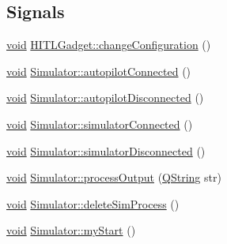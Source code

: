 \subsection*{Signals}
\begin{DoxyCompactItemize}
\item 
\hyperlink{group___u_a_v_objects_plugin_ga444cf2ff3f0ecbe028adce838d373f5c}{void} \hyperlink{group___h_i_t_l_plugin_ga13e1705f62c6f94853cd64d477b213ef}{H\-I\-T\-L\-Gadget\-::change\-Configuration} ()
\item 
\hyperlink{group___u_a_v_objects_plugin_ga444cf2ff3f0ecbe028adce838d373f5c}{void} \hyperlink{group___h_i_t_l_plugin_gac7a4b06b939b52699df392d65a575285}{Simulator\-::autopilot\-Connected} ()
\item 
\hyperlink{group___u_a_v_objects_plugin_ga444cf2ff3f0ecbe028adce838d373f5c}{void} \hyperlink{group___h_i_t_l_plugin_ga24f5c82338e62ddaa39f3ea0624f71da}{Simulator\-::autopilot\-Disconnected} ()
\item 
\hyperlink{group___u_a_v_objects_plugin_ga444cf2ff3f0ecbe028adce838d373f5c}{void} \hyperlink{group___h_i_t_l_plugin_gaa228d07fc331cb9526ea7e35657c762c}{Simulator\-::simulator\-Connected} ()
\item 
\hyperlink{group___u_a_v_objects_plugin_ga444cf2ff3f0ecbe028adce838d373f5c}{void} \hyperlink{group___h_i_t_l_plugin_gad742612caa0cecd4258bd9bdccf38336}{Simulator\-::simulator\-Disconnected} ()
\item 
\hyperlink{group___u_a_v_objects_plugin_ga444cf2ff3f0ecbe028adce838d373f5c}{void} \hyperlink{group___h_i_t_l_plugin_ga2442aac38c69150f1089c874f766793e}{Simulator\-::process\-Output} (\hyperlink{group___u_a_v_objects_plugin_gab9d252f49c333c94a72f97ce3105a32d}{Q\-String} str)
\item 
\hyperlink{group___u_a_v_objects_plugin_ga444cf2ff3f0ecbe028adce838d373f5c}{void} \hyperlink{group___h_i_t_l_plugin_ga04206cd250313cf8c8e4db8a19f88479}{Simulator\-::delete\-Sim\-Process} ()
\item 
\hyperlink{group___u_a_v_objects_plugin_ga444cf2ff3f0ecbe028adce838d373f5c}{void} \hyperlink{group___h_i_t_l_plugin_gaf7e8415c98faa84030b51013ef49fa4e}{Simulator\-::my\-Start} ()
\end{DoxyCompactItemize}
